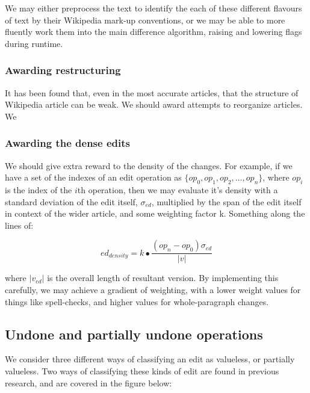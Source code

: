 \documentclass[a4paper,11pt,twoside,notitlepage]{article}
\begin{document}
        We may either preprocess the text to identify the each of
        these different flavours of text by their Wikipedia mark-up
        conventions, or we may be able to more fluently work them into
        the main difference algorithm, raising and lowering flags
        during runtime.

        \subsubsection*{Awarding restructuring}
        It has been found that, even in the most accurate articles,
        that the structure of Wikipedia article can be
        weak.\cite{Giles2005} We should award attempts to reorganize
        articles. We 
        
        \subsubsection*{Awarding the dense edits}
        We should give extra reward to the density of the
        changes. For example, if we have a set of the indexes of an
        edit operation as $\{op_0,op_1,op_2,\dots, op_n\}$, where
        $op_i$ is the index of the $i$th operation, then we may
        evaluate it's density with a standard deviation of the edit
        itself, $\sigma_{ed}$, multiplied by the span of the edit
        itself in context of the wider article, and some weighting
        factor k. Something along the lines of:

        $$ed_{density} = k\bullet\frac{(op_n - op_0)\sigma_{ed}}{|v|}$$ 

        where $|v_{ed}|$ is the overall length of resultant version. By
        implementing this carefully, we may achieve a gradient of
        weighting, with a lower weight values for things like
        spell-checks, and higher values for whole-paragraph changes.

        \subsection*{Undone and partially undone operations}
        We consider three different ways of classifying an edit as
        valueless, or partially valueless. Two ways of classifying
        these kinds of edit are found in previous research, and are
        covered in the figure below:
\end{document}
